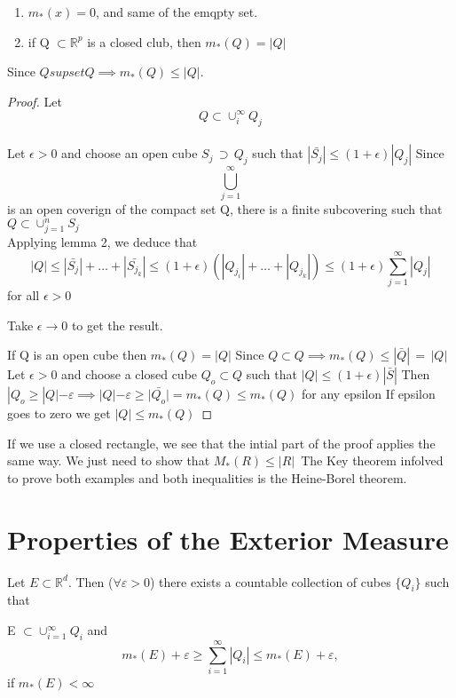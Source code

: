 \documentclass{article}[12 pt]
\begin{document}
\begin{enumerate}
	\item $m_*({x}) = 0$, and same of the emqpty set.
	\item if Q $\subset \mathbb{R}^p$ is a closed club, then $m_{*}(Q) = |Q|$
\end{enumerate}
Since $Q supset Q \implies m_{*}(Q) \leq |Q|$.\\
\begin{proof}
	Let $$Q \subset \cup_{i}^{\infty}Q_j$$\\
	Let $\epsilon > 0$ and choose an open cube $S_j\, \supset\, Q_j$ such that $|\bar{S_j}| \leq (1+\epsilon) |Q_j|$
	Since $$\bigcup_{j=1}^{\infty}$$ is an open coverign of the compact set Q, there is a finite subcovering such that $Q \subset \cup_{j=1}^{n}S_j$\\

	Applying lemma 2, we deduce that
	\begin{equation}
		|Q| \leq |\bar{S_j}| + \dots + |\bar{S_{j_{k}}}| \leq (1+\epsilon)(|Q_{j_{i}}| + \dots + |Q_{j_{k}}|) \leq (1+\epsilon) \sum_{j=1}^{\infty} |Q_j|
	\end{equation}
	for all $\epsilon > 0$

	Take $\epsilon \to 0$ to get the result.

	If Q is an open cube then $m_{*}(Q) = |Q|$
	Since $Q \subset Q \implies m_{*}(Q) \leq |\bar{Q}|\,=\,|Q|$
	Let $\epsilon > 0$ and choose a closed cube $Q_{o} \subset Q$ such that $|Q| \leq (1+\epsilon)|\bar{S}|$
	Then $|Q_{o} \geq |Q| -\varepsilon \implies |Q| - \varepsilon \geq |\bar{Q_{o}}| = m_{*}(Q) \leq m_{*}(Q)$ for any epsilon
	If epsilon goes to zero we get $|Q| \leq m_{*}(Q)$
\end{proof}

If we use a closed rectangle, we see that the intial part of the proof applies the same way.
We just need to show that $M_{*}(R) \leq |R|$\
The Key theorem infolved to prove both examples and both inequalities is the Heine-Borel theorem.


\section{Properties of the Exterior Measure}
Let $E \subset \mathbb{R}^d$. Then ($\forall \varepsilon > 0$) there exists a countable collection of cubes $\{Q_i\}$ such that

E $\subset \cup_{i=1}^{\infty}Q_i$ and
\begin{equation}
	m_{*}(E) + \varepsilon \geq \sum_{i=1}^{\infty}|Q_i| \leq m_{*}(E) + \varepsilon,
\end{equation}
if $m_{*}(E) < \infty$\\
\end{document}
